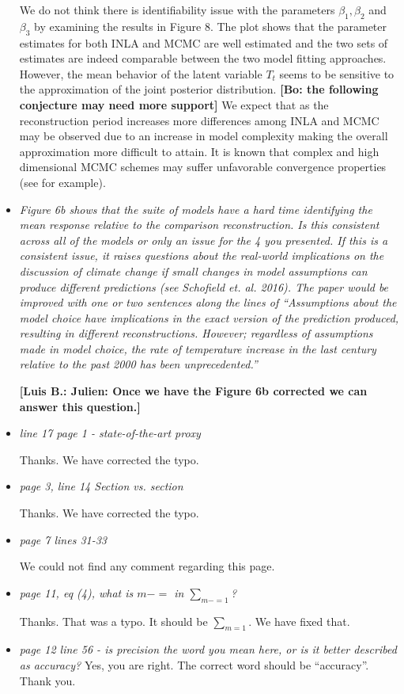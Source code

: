 \documentclass[11pt]{article}
\newcommand{\lb}[1]{\color{ForestGreen}\textbf{[Luis B.: #1]}\normalcolor}
\newcommand{\bl}[1]{\color{red}\textbf{[Bo: #1]}\normalcolor}
\begin{document}
\begin{itemize}
We do not think there is identifiability issue with the parameters
\(\beta_1,\beta_2\) and \(\beta_3\) by examining the results in Figure 8. The plot shows that the parameter estimates for both INLA and MCMC are well estimated and the two sets of estimates are indeed comparable between the two model fitting approaches.
However, the mean behavior of the latent variable
\(T_t\) seems to be sensitive to the approximation of the
joint posterior distribution. \bl{the following conjecture may need more support} We
expect that as the reconstruction period increases more
differences among INLA and MCMC may be observed due to an increase in model complexity
making the overall approximation more difficult to attain. It is known that
complex and high dimensional MCMC schemes may suffer unfavorable convergence
properties (see \cite{Rajaratnam2015} for example).  
  
\item \textit{Figure 6b shows that the suite of models have a hard time identifying
    the mean response relative to the comparison reconstruction. Is this
    consistent across all of the models or only an issue for the 4 you
    presented. If this is a consistent issue, it raises questions about the
    real-world implications on the discussion of climate change if small changes
    in model assumptions can produce different predictions (see Schofield et.
    al. 2016). The paper would be improved with one or two sentences along the
    lines of ``Assumptions about the model choice have implications in the exact
    version of the prediction produced, resulting in different reconstructions.
    However; regardless of assumptions made in model choice, the rate of
    temperature increase in the last century relative to the past 2000 has been unprecedented.''}

\lb{Julien: Once we have the Figure 6b corrected we can answer this question.}  
  
\item \textit{line 17 page 1 - state-of-the-art proxy}

Thanks. We have corrected the typo.
  
\item \textit{page 3, line 14 Section vs. section}

  Thanks. We have corrected the typo.
  
\item \textit{page 7 lines 31-33}

We could not find any comment regarding this page. 

  
\item \textit{page 11, eq (4), what is \(m-=\) in \(\sum_{m-=1}\)?}

  Thanks. That was a typo. It should be \(\sum_{m=1}\). We have fixed that. 
  
\item \textit{page 12 line 56 - is precision the word you mean here, or is it
    better described as accuracy?}
  Yes, you are right. The correct word should be ``accuracy''. Thank you. 
\end{itemize}



\end{document}
